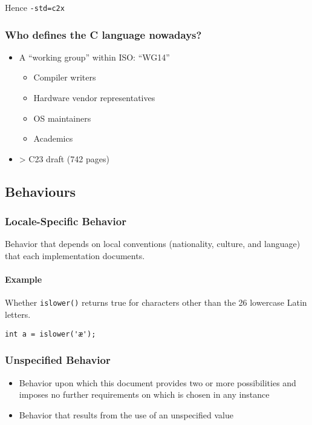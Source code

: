 \documentclass[12pt]{article}
\begin{document}
Hence \verb|-std=c2x|

\subsubsection{Who defines the C language nowadays?}

\begin{itemize}
    \item A ``working group'' within ISO: ``WG14''
    \begin{itemize}
        \item Compiler writers
        \item Hardware vendor representatives
        \item OS maintainers
        \item Academics
    \end{itemize}
    \item \textgreater{} C23 draft (742 pages)
\end{itemize}

\subsection{Behaviours}

\subsubsection{Locale-Specific Behavior}

Behavior that depends on local conventions (nationality, culture, and language) that each implementation documents.

\paragraph{Example}

Whether \texttt{islower()} returns true for characters other than the 26 lowercase Latin letters.

\begin{verbatim}
int a = islower('æ');
\end{verbatim}

\subsubsection{Unspecified Behavior}

\begin{itemize}
  \item Behavior upon which this document provides two or more possibilities and imposes no further requirements on which is chosen in any instance
  \item Behavior that results from the use of an unspecified value
\end{itemize}
\end{document}
